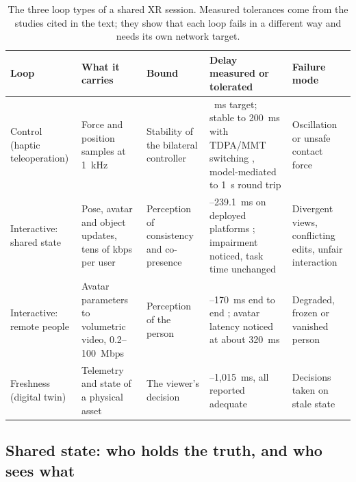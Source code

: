 \begin{table}[t]
\centering\small
\caption{The three loop types of a shared XR session. Measured tolerances come from the studies cited in the text; they show that each loop fails in a different way and needs its own network target.}
\label{tab:connect-loops}
\begin{tabularx}{\linewidth}{@{}>{\raggedright\arraybackslash}p{2.05cm}>{\raggedright\arraybackslash}X>{\raggedright\arraybackslash}p{2.0cm}>{\raggedright\arraybackslash}X>{\raggedright\arraybackslash}X@{}}
\toprule
Loop & What it carries & Bound & Delay measured or tolerated & Failure mode \\
\midrule
Control (haptic teleoperation) & Force and position samples at 1~kHz & Stability of the bilateral controller & 1~ms target; stable to 200~ms with TDPA/MMT switching \cite{W4200154132}, model-mediated to 1~s round trip \cite{W2811040154} & Oscillation or unsafe contact force \\
Interactive: shared state & Pose, avatar and object updates, tens of kbps per user & Perception of consistency and co-presence & 101.7--239.1~ms on deployed platforms \cite{W4307020344}; impairment noticed, task time unchanged \cite{W4392600587} & Divergent views, conflicting edits, unfair interaction \\
Interactive: remote people & Avatar parameters to volumetric video, 0.2--100~Mbps & Perception of the person & 70--170~ms end to end \cite{W4312662428}; avatar latency noticed at about 320~ms \cite{W4312899133} & Degraded, frozen or vanished person \\
Freshness (digital twin) & Telemetry and state of a physical asset & The viewer's decision & 29.63--1,015~ms, all reported adequate \cite{W7213228059,W7168263637} & Decisions taken on stale state \\
\bottomrule
\end{tabularx}
\end{table}

\subsection{Shared state: who holds the truth, and who sees what}

